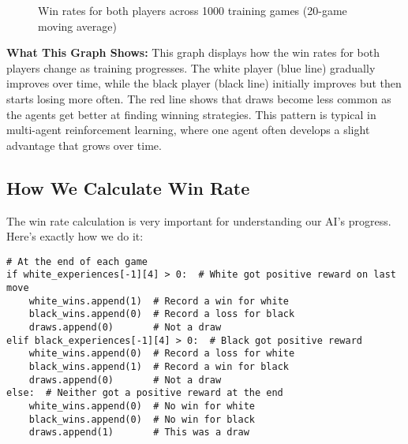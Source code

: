\documentclass[11pt]{article}
\begin{document}
\begin{figure}[ht]
    \caption{Win rates for both players across 1000 training games (20-game moving average)}
    \label{fig:win_rates}
\end{figure}

\textbf{What This Graph Shows:} This graph displays how the win rates for both players change as training progresses. The white player (blue line) gradually improves over time, while the black player (black line) initially improves but then starts losing more often. The red line shows that draws become less common as the agents get better at finding winning strategies. This pattern is typical in multi-agent reinforcement learning, where one agent often develops a slight advantage that grows over time.

\subsection{How We Calculate Win Rate}

The win rate calculation is very important for understanding our AI's progress. Here's exactly how we do it:

\begin{tcolorbox}[colback=yellow!5!white,colframe=yellow!75!black,title=Calculating Win Rates]
\begin{lstlisting}[style=Python]
# At the end of each game
if white_experiences[-1][4] > 0:  # White got positive reward on last move
    white_wins.append(1)  # Record a win for white
    black_wins.append(0)  # Record a loss for black
    draws.append(0)       # Not a draw
elif black_experiences[-1][4] > 0:  # Black got positive reward
    white_wins.append(0)  # Record a loss for white
    black_wins.append(1)  # Record a win for black
    draws.append(0)       # Not a draw
else:  # Neither got a positive reward at the end
    white_wins.append(0)  # No win for white
    black_wins.append(0)  # No win for black
    draws.append(1)       # This was a draw


\end{lstlisting}
\end{tcolorbox}
\end{document}
\end{tikzpicture}
\end{figure}
\end{document}
\end{tikzpicture}
\end{figure}
\end{document}
